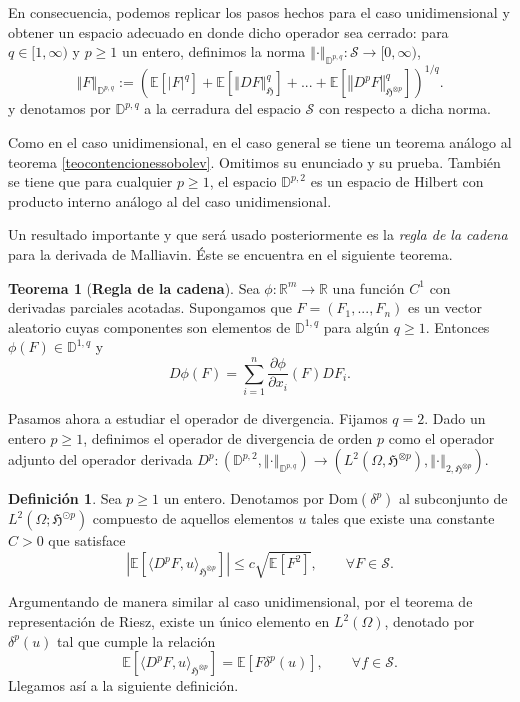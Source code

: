 \documentclass[letterpaper,twoside,12pt]{book}
\newcommand{\R}{\mathbb{R}}
\newcommand{\D}{\mathbb{D}}
\renewcommand{\S}{\mathcal{S}}
\newcommand{\E}{\mathbb{E}}
\newcommand{\1}{\mathds{1}}
\newcommand{\abs}[1]{\left\lvert #1 \right\rvert}
\renewcommand{\to}{\rightarrow}
\newcommand{\norm}[1]{\left\Vert #1 \right\Vert}
\theoremstyle{definition}
\newtheorem{dfn}{Definición}
\theoremstyle{definition}
\newtheorem{teo}{Teorema}
\theoremstyle{remark}
\theoremstyle{definition}
\theoremstyle{definition}
\theoremstyle{definition}
\theoremstyle{definition}
\theoremstyle{definition}
\begin{document}
En consecuencia, podemos replicar los pasos hechos para el caso unidimensional y obtener un espacio adecuado en donde dicho operador sea cerrado: para $q\in [1,\infty)$ y $p\geq1$ un entero, definimos la norma $\norm{\cdot}_{\D^{p,q}}:\S\to [0,\infty)$,
\[
\norm{F}_{\D^{p,q}}:= \left(\E\left[\abs{F}^{q}\right]+\E\left[\norm{DF}^{q}_{\mathfrak{H}}\right]+...+\E\left[\norm{D^pF}_{\mathfrak{H}^{\otimes p}}^q\right]\right)^{1/q}.
\]
y denotamos por $\D^{p,q}$ a la cerradura del espacio $\S$ con respecto a dicha norma. 

Como en el caso unidimensional, en el caso general se tiene un teorema análogo al teorema \ref{teocontencionessobolev}. Omitimos su enunciado y su prueba. También se tiene que para cualquier $p\geq1$, el espacio $\D^{p,2}$ es un espacio de Hilbert con producto interno análogo al del caso unidimensional.

Un resultado importante y que será usado posteriormente es la \textit{regla de la cadena} para la derivada de Malliavin. Éste se encuentra en el siguiente teorema.

\begin{teo}[\textbf{Regla de la cadena}]\label{reglacadena} 
 Sea $\phi:\R^{m}\to \R$ una función $C^1$ con derivadas parciales acotadas. Supongamos que $F=(F_1,...,F_n)$ es un vector aleatorio cuyas componentes son elementos de $\D^{1,q}$ para algún $q\geq1$. Entonces $\phi(F)\in \D^{1,q}$ y 
 \[
D\phi(F)=\sum_{i=1}^n \frac{\partial \phi}{\partial x_i}(F)DF_i.
 \]
 \end{teo}
Pasamos ahora a estudiar el operador de divergencia. Fijamos $q=2$. Dado un entero $p\geq1$, definimos el operador de divergencia de orden $p$ como el operador adjunto del operador derivada $D^{p}:\left(\D^{p,2}, \norm{\cdot}_{\D^{p,q}}\right)\to \left(L^{2}(\Omega,\mathfrak{H}^{\otimes p}), \norm{\cdot}_{2,\mathfrak{H}^{\otimes p}}\right)$.

\begin{dfn} 
 Sea $p\geq1$ un entero. Denotamos por $\text{Dom}(\delta^p)$ al subconjunto de $L^2(\Omega;\mathfrak{H}^{\odot p})$ compuesto de aquellos elementos $u$ tales que existe una constante $C>0$ que satisface 
 \[
 \abs{\E\left[\langle D^pF,u\rangle_{\mathfrak{H}^{\otimes p}}\right]}\leq c\sqrt{\E\left[F^2\right]}, \qquad \forall F \in \S.
 \]
 \end{dfn}
 Argumentando de manera similar al caso unidimensional, por el teorema de representación de Riesz, existe un único elemento en $L^2(\Omega)$, denotado por $\delta^p(u)$ tal que cumple la relación 
 \[
 \E\left[\langle D^pF,u\rangle_{\mathfrak{H}^{\otimes p}}\right]=\E\left[F\delta^{p}(u)\right], \qquad \forall f\in \S.
 \]
 Llegamos así a la siguiente definición.
\end{document}
